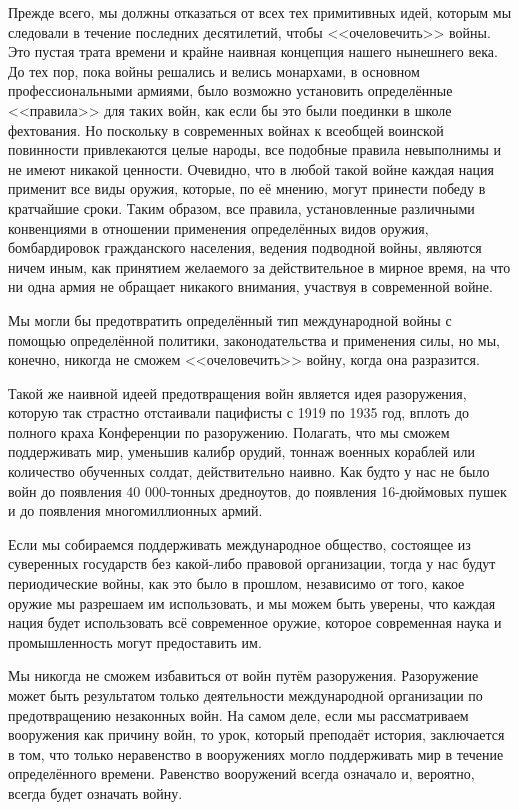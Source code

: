 Прежде всего, мы должны отказаться от всех тех примитивных идей, которым мы следовали в течение последних десятилетий, чтобы <<очеловечить>> войны. Это пустая трата времени и крайне наивная концепция нашего нынешнего века. До тех пор, пока войны решались и велись монархами, в основном профессиональными армиями, было возможно установить определённые <<правила>> для таких войн, как если бы это были поединки в школе фехтования. Но поскольку в современных войнах к всеобщей воинской повинности привлекаются целые народы, все подобные правила невыполнимы и не имеют никакой ценности. Очевидно, что в любой такой войне каждая нация применит все виды оружия, которые, по её мнению, могут принести победу в кратчайшие сроки. Таким образом, все правила, установленные различными конвенциями в отношении применения определённых видов оружия, бомбардировок гражданского населения, ведения подводной войны, являются ничем иным, как принятием желаемого за действительное в мирное время, на что ни одна армия не обращает никакого внимания, участвуя в современной войне.
 
Мы могли бы предотвратить определённый тип международной войны с помощью определённой политики, законодательства и применения силы, но мы, конечно, никогда не сможем <<очеловечить>> войну, когда она разразится.
 
Такой же наивной идеей предотвращения войн является идея разоружения, которую так страстно отстаивали пацифисты с 1919 по 1935 год, вплоть до полного краха Конференции по разоружению. Полагать, что мы сможем поддерживать мир, уменьшив калибр орудий, тоннаж военных кораблей или количество обученных солдат, действительно наивно. Как будто у нас не было войн до появления 40 000-тонных дредноутов, до появления 16-дюймовых пушек и до появления многомиллионных армий.
 
Если мы собираемся поддерживать международное общество, состоящее из суверенных государств без какой-либо правовой организации, тогда у нас будут периодические войны, как это было в прошлом, независимо от того, какое оружие мы разрешаем им использовать, и мы можем быть уверены, что каждая нация будет использовать всё современное оружие, которое современная наука и промышленность могут предоставить им.
 
Мы никогда не сможем избавиться от войн путём разоружения. Разоружение может быть результатом только деятельности международной организации по предотвращению незаконных войн. На самом деле, если мы рассматриваем вооружения как причину войн, то урок, который преподаёт история, заключается в том, что только неравенство в вооружениях могло поддерживать мир в течение определённого времени. Равенство вооружений всегда означало и, вероятно, всегда будет означать войну.
 
